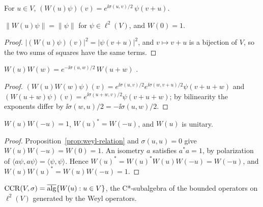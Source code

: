 \begin{definition}\label{def:weyl}
For $u\in V$, $(W(u)\psi)(v)=e^{\ii\sigma(u,v)/2}\,\psi(v+u)$.
\end{definition}

\begin{lemma}[Isometry]\label{lem:weyl-isometry}
 $\|W(u)\psi\|=\|\psi\|$
for  $\psi\in\ell^2(V)$, and $W(0)=1$.
\end{lemma}
\begin{proof}
$|(W(u)\psi)(v)|^2=|\psi(v+u)|^2$, and $v\mapsto v+u$ is a bijection of $V$, so the two sums of
squares have the same terms.
\end{proof}

\begin{proposition}\label{prop:weyl-relation}
 $W(u)W(w)=e^{-\ii\sigma(u,w)/2}\,W(u+w)$ .
\end{proposition}
\begin{proof}
$(W(u)W(w)\psi)(v)=e^{\ii\sigma(u,v)/2}e^{\ii\sigma(w,v+u)/2}\psi(v+u+w)$ and
$(W(u+w)\psi)(v)=e^{\ii\sigma(u+w,v)/2}\psi(v+u+w)$; by bilinearity the exponents differ by
$\ii\sigma(w,u)/2=-\ii\sigma(u,w)/2$.
\end{proof}

\begin{proposition}[Unitarity]\label{prop:weyl-unitary}
 $W(u)W(-u)=1$, $W(u)^*=W(-u)$, and $W(u)$ is unitary.
\end{proposition}
\begin{proof}
Proposition~\ref{prop:weyl-relation} and $\sigma(u,u)=0$ give $W(u)W(-u)=W(0)=1$. An isometry
$a$ satisfies $a^*a=1$, by polarization of $\langle a\psi,a\psi\rangle=\langle\psi,\psi\rangle$.
Hence $W(u)^*=W(u)^*W(u)W(-u)=W(-u)$, and $W(u)W(u)^*=W(u)W(-u)=1$.
\end{proof}

\begin{definition}\label{def:ccr}
$\operatorname{CCR}(V,\sigma)=\overline{\operatorname{alg}}\{W(u):u\in V\}$, the C*-subalgebra of the bounded operators on
$\ell^2(V)$ generated by the Weyl operators.
\end{definition}

